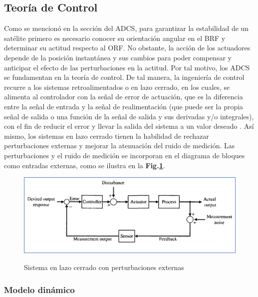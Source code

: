 \subsection{Teoría de Control}
Como se mencionó en la sección del ADCS, para garantizar la estabilidad de un satélite primero es necesario conocer su orientación angular en el BRF y determinar su actitud respecto al ORF. No obstante, la acción de los actuadores depende de la posición instantánea y sus cambios para poder compensar y anticipar el efecto de las perturbaciones en la actitud. Por tal motivo, los ADCS se fundamentan en la teoría de control.
De tal manera, la ingeniería de control recurre a los sistemas retroalimentados o en lazo cerrado, en los cuales, se alimenta al controlador con la señal de error de actuación, que es la diferencia entre la señal de entrada y la señal de realimentación (que puede ser la propia señal de salida o una función de la señal de salida y sus derivadas y/o integrales), con el fin de reducir el error y llevar la salida del sistema a un valor deseado \cite{ogata2010modern}. 
Así mismo, los sistemas en lazo cerrado tienen la habilidad de rechazar perturbaciones externas y mejorar la atenuación del ruido de medición. Las perturbaciones y el ruido de medición se incorporan en el diagrama de bloques como entradas externas, como se ilustra en la \textbf{Fig.\ref{fig:feedback}}.



\begin{figure}[!ht]
	\begin{center}
		\includegraphics[scale=0.8]{imagenes/marco_teorico/lazo cerrado.PNG}\\
	\end{center}
	\caption{  Sistema en lazo cerrado con perturbaciones externas }
	\label{fig:feedback}
\end{figure}
\subsubsection{Modelo dinámico}

